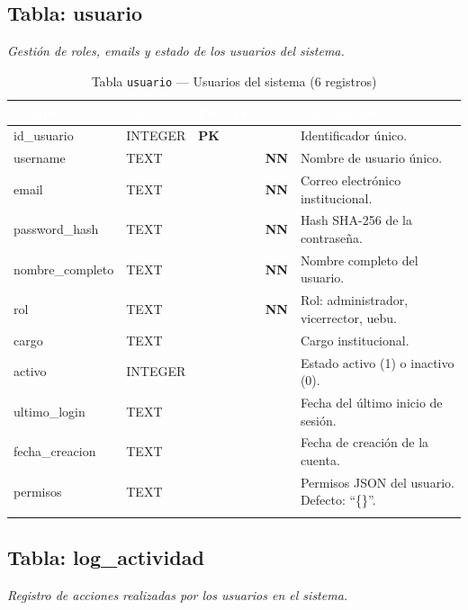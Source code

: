 \documentclass[11pt,a4paper]{article}
\newcommand{\tableheadrow}{\rowcolor{tableheader}}
\newcommand{\tablehead}[1]{\textcolor{white}{\textbf{#1}}}
\newcommand{\pk}{\textcolor{emiblue}{\textbf{PK}}}
\newcommand{\nn}{\textcolor{red!70!black}{\textbf{NN}}}
\begin{document}
\subsection{Tabla: usuario}
\textit{Gestión de roles, emails y estado de los usuarios del sistema.}

\begin{longtable}{p{4.2cm} p{2.8cm} c c c p{4.5cm}}
\toprule
\tableheadrow
\tablehead{Campo} & \tablehead{Tipo} & \tablehead{PK} & \tablehead{FK} & \tablehead{NN} & \tablehead{Descripción} \\
\midrule
\endhead
id\_usuario & INTEGER & \pk & & & Identificador único. \\
\rowcolor{tablerow}
username & TEXT & & & \nn & Nombre de usuario único. \\
email & TEXT & & & \nn & Correo electrónico institucional. \\
\rowcolor{tablerow}
password\_hash & TEXT & & & \nn & Hash SHA-256 de la contraseña. \\
nombre\_completo & TEXT & & & \nn & Nombre completo del usuario. \\
\rowcolor{tablerow}
rol & TEXT & & & \nn & Rol: administrador, vicerrector, uebu. \\
cargo & TEXT & & & & Cargo institucional. \\
\rowcolor{tablerow}
activo & INTEGER & & & & Estado activo (1) o inactivo (0). \\
ultimo\_login & TEXT & & & & Fecha del último inicio de sesión. \\
\rowcolor{tablerow}
fecha\_creacion & TEXT & & & & Fecha de creación de la cuenta. \\
permisos & TEXT & & & & Permisos JSON del usuario. Defecto: ``\{\}''. \\
\bottomrule
\caption{Tabla \texttt{usuario} — Usuarios del sistema (6 registros)}
\end{longtable}

\subsection{Tabla: log\_actividad}
\textit{Registro de acciones realizadas por los usuarios en el sistema.}
\end{document}
